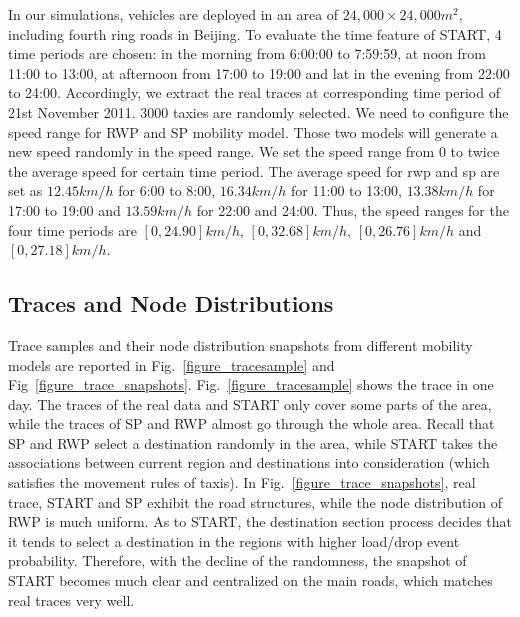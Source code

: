 In our simulations, vehicles are deployed in an area of $24,000\times 24,000 m^2$, including fourth ring roads in Beijing.
To evaluate the time feature of START, 4 time periods are chosen: in the morning from 6:00:00 to 7:59:59, at noon from 11:00 to 13:00, at afternoon from 17:00 to 19:00 and lat in the evening from 22:00 to 24:00. Accordingly, we extract the real traces at corresponding time period of 21st November 2011.
3000 taxies are randomly selected. 
We need to configure the speed range for RWP and SP mobility model. Those two models will generate a new speed randomly in the speed range. We set the speed range from 0 to twice the average speed for certain time period.
The average speed for rwp and sp are set as $12.45 km/h$ for 6:00 to 8:00, $16.34km/h$ for 11:00 to 13:00, $13.38km/h$ for 17:00 to 19:00 and $13.59 km/h$ for 22:00 and 24:00. 
Thus, the speed ranges for the four time periods are $[0, 24.90]km/h$, $[0, 32.68]km/h$, $[0, 26.76]km/h$ and $[0, 27.18]km/h$.
\subsection{Traces and Node Distributions}


Trace samples and their node distribution snapshots from different mobility models are reported in Fig.~\ref{figure_tracesample} and Fig~\ref{figure_trace_snapshots}. Fig.~\ref{figure_tracesample} shows the trace in one day. The traces of the real data and START only cover some parts of the area, while the traces of SP and RWP almost go through the whole area. Recall that SP and RWP select a destination randomly in the area, while START takes the associations between current region and destinations into consideration (which satisfies the movement rules of taxis). In Fig.~\ref{figure_trace_snapshots}, real trace, START and SP exhibit the road structures, while the node distribution of RWP is much uniform. As to START, the destination section process decides that it tends to select a destination in the regions with higher load/drop event probability. Therefore, with the decline of the randomness, the snapshot of START becomes much clear and centralized on the main roads, which matches real traces very well.

